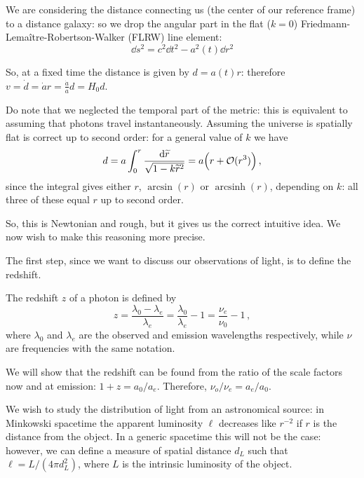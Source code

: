 \documentclass[main.tex]{subfiles}
\begin{document}
We are considering the distance connecting us (the center of our reference frame) to a distance galaxy: so we drop the angular part in the flat (\(k = 0\)) Friedmann-Lemaître-Robertson-Walker (FLRW) line element:
%
\begin{equation}
  \dd{s^2} = c^2 \dd{t^2} - a^2(t) \dd{r^2}
\end{equation}

So, at a fixed time the distance is given by \(d = a(t) r\): therefore \(v = \dot{d} = \dot{a}r = \frac{\dot{a} }{a} d = H_0 d\). 

Do note that we neglected the temporal part of the metric: this is equivalent to assuming that photons travel instantaneously.
Assuming the universe is spatially flat is correct up to second order: for a general value of \(k\) we have 
%
\begin{align}
d = a \int_{0}^{r} \frac{ \dd{\widetilde{r}} }{\sqrt{1 - k \widetilde{r}^2}} = a  \qty( r + \mathcal{O}(r^3))
\,,
\end{align}
%
since the integral gives either \(r\), \(\arcsin(r)\) or \(\operatorname{arcsinh}(r)\), depending on \(k\): all three of these equal \(r\) up to second order.

So, this is Newtonian and rough, but it gives us the correct intuitive idea.
We now wish to make this reasoning more precise.

The first step, since we want to discuss our observations of light, is to define the redshift.

\begin{definition}[Redshift]
The redshift \(z\) of a photon is defined by
%
\begin{equation}
  z = \frac{\lambda_0 - \lambda_e}{\lambda_{e}}
  = \frac{\lambda_0 }{\lambda_{e}} - 1
  = \frac{\nu_{e}}{\nu_{0}} - 1
  \,,
\end{equation}
%
where \(\lambda_0\) and \(\lambda_e\) are the observed and emission wavelengths respectively, while \(\nu \) are frequencies with the same notation.
\end{definition}

We will show that the redshift can be found from the ratio of the scale factors now and at emission: \(1+z = a_0/ a_e\).
Therefore, \(\nu_o / \nu_e = a_e / a_0\).

We wish to study the distribution of light from an astronomical source: in Minkowski spacetime the apparent luminosity \(\ell\) decreases like \(r^{-2}\) if \(r\) is the distance from the object.
In a generic spacetime this will not be the case: however, we can define a measure of spatial distance \(d_L\) such that \(\ell = L / (4 \pi d_L^2)\), where \(L\) is the intrinsic luminosity of the object.
\end{document}
